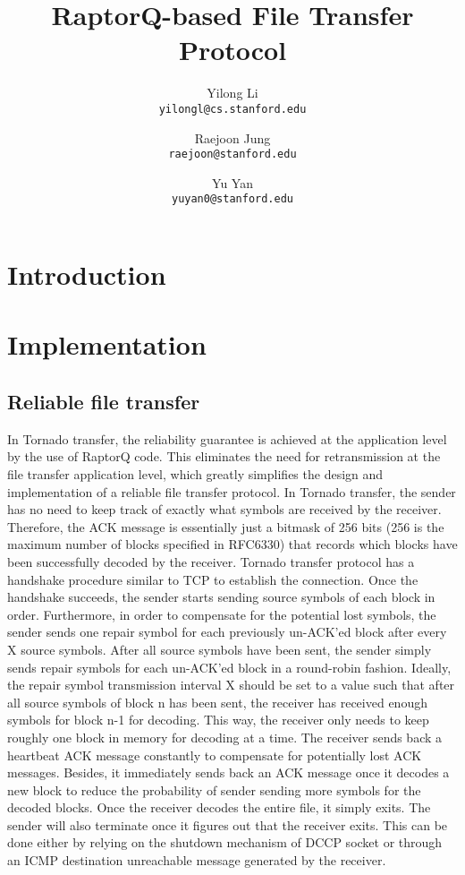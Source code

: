 \documentclass{sig-alternate-10pt}
\begin{document}
\title{RaptorQ-based File Transfer Protocol} 
\author{ 
Yilong Li\\
\texttt{yilongl@cs.stanford.edu} \and 
Raejoon Jung\\
\texttt{raejoon@stanford.edu} \and 
Yu Yan\\ 
\texttt{yuyan0@stanford.edu} 
}

\maketitle 

\section{Introduction}

\section{Implementation}

\subsection{Reliable file transfer} 
In Tornado transfer, the reliability guarantee is achieved at the application
level by the use of RaptorQ code. This eliminates the need for retransmission
at the file transfer application level, which greatly simplifies the design and
implementation of a reliable file transfer protocol. In Tornado transfer, the
sender has no need to keep track of exactly what symbols are received by the
receiver. Therefore, the ACK message is essentially just a bitmask of 256 bits
(256 is the maximum number of blocks specified in RFC6330) that records which
blocks have been successfully decoded by the receiver. Tornado transfer
protocol has a handshake procedure similar to TCP to establish the connection.
Once the handshake succeeds, the sender starts sending source symbols of each
block in order. Furthermore, in order to compensate for the potential lost
symbols, the sender sends one repair symbol for each previously un-ACK'ed block
after every X source symbols. After all source symbols have been sent, the
sender simply sends repair symbols for each un-ACK'ed block in a round-robin
fashion. Ideally, the repair symbol transmission interval X should be set to a
value such that after all source symbols of block n has been sent, the receiver
has received enough symbols for block n-1 for decoding. This way, the receiver
only needs to keep roughly one block in memory for decoding at a time. The
receiver sends back a heartbeat ACK message constantly to compensate for
potentially lost ACK messages. Besides, it immediately sends back an ACK
message once it decodes a new block to reduce the probability of sender sending
more symbols for the decoded blocks. Once the receiver decodes the entire file,
it simply exits. The sender will also terminate once it figures out that the
receiver exits. This can be done either by relying on the shutdown mechanism of
DCCP socket or through an ICMP destination unreachable message generated by the
receiver.
\end{document}
